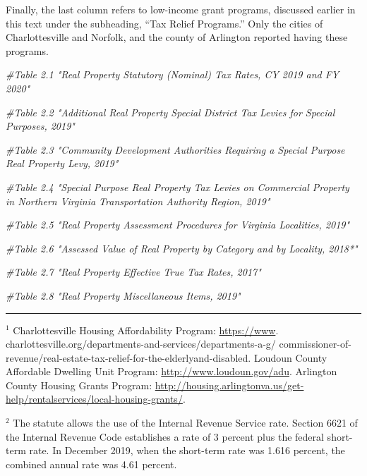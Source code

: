 \documentclass[
]{book}
\newenvironment{Shaded}{\begin{snugshade}}{\end{snugshade}}
\newcommand{\CommentTok}[1]{\textcolor[rgb]{0.56,0.35,0.01}{\textit{#1}}}
\begin{document}
Finally, the last column refers to low-income grant programs, discussed earlier in this text under the subheading, ``Tax Relief Programs.'' Only the cities of Charlottesville and Norfolk, and the county of Arlington reported having these programs.

\begin{Shaded}
\begin{Highlighting}[]
\CommentTok{\#Table 2.1 "Real Property Statutory (Nominal) Tax Rates, CY 2019 and FY 2020"}


\CommentTok{\#Table 2.2 "Additional Real Property Special District Tax Levies for Special Purposes, 2019"}


\CommentTok{\#Table 2.3 "Community Development Authorities Requiring a Special Purpose Real Property Levy, 2019" }


\CommentTok{\#Table 2.4 "Special Purpose Real Property Tax Levies on Commercial Property in Northern Virginia Transportation Authority Region, 2019" }


\CommentTok{\#Table 2.5 "Real Property Assessment Procedures for Virginia Localities, 2019" }


\CommentTok{\#Table 2.6 "Assessed Value of Real Property by Category and by Locality, 2018*"}


\CommentTok{\#Table 2.7 "Real Property Effective True Tax Rates, 2017"}


\CommentTok{\#Table 2.8 "Real Property Miscellaneous Items, 2019"}
\end{Highlighting}
\end{Shaded}

\begin{center}\rule{0.5\linewidth}{0.5pt}\end{center}

\(^1\) Charlottesville Housing Affordability Program: \url{https://www}.
charlottesville.org/departments-and-services/departments-a-g/
commissioner-of-revenue/real-estate-tax-relief-for-the-elderlyand-disabled. Loudoun County Affordable Dwelling Unit Program: \url{http://www.loudoun.gov/adu}. Arlington County Housing
Grants Program: \url{http://housing.arlingtonva.us/get-help/rentalservices/local-housing-grants/}.

\(^2\) The statute allows the use of the Internal Revenue Service rate. Section 6621 of the Internal Revenue Code establishes a rate of 3 percent plus the federal short-term rate. In December 2019, when the short-term rate was 1.616 percent, the combined annual rate was 4.61 percent.
\end{document}
